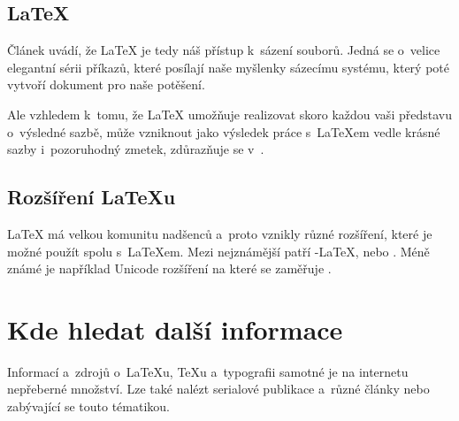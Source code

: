 \documentclass[a4paper, 11pt]{article}[8.4.2020]
\begin{document}
\subsection{\LaTeX}
Článek \cite{programujte} uvádí, že {\LaTeX} je tedy náš přístup k~sázení souborů. Jedná se o~velice elegantní sérii příkazů, které posílají naše myšlenky sázecímu systému, který poté vytvoří dokument pro naše potěšení.
\par Ale vzhledem k~tomu, že {\LaTeX} umožňuje realizovat skoro každou vaši představu o~výsledné sazbě, může vzniknout jako výsledek práce s~{\LaTeX}em vedle krásné sazby i~pozoruhodný zmetek, zdůrazňuje se v~\cite{cstug}.

\subsection{Rozšíření {\LaTeX}u}
{\LaTeX} má velkou komunitu nadšenců a~proto vznikly různé rozšíření, které je možné použít spolu s~{\LaTeX}em. Mezi nejznámější patří {\AmS}-{\LaTeX}, {\BibTeX} nebo {\MiKTeX}. Méně známé je například Unicode rozšíření {\XeTeX} na které se zaměřuje \cite{Kocur}.

\section{Kde hledat další informace}
Informací a~zdrojů o~{\LaTeX}u, {\TeX}u a~typografii samotné je na internetu nepřeberné množství. Lze také nalézt serialové publikace \cite{cstug} a~různé články\cite{rootcz} nebo \cite{FullCircle} zabývající se touto tématikou.

\newpage

\renewcommand{\refname}{Bibliografie}

\end{document}
